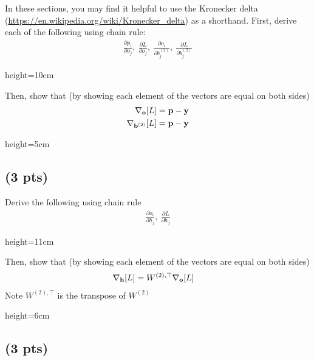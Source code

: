 In these sections, you may find it helpful to use the Kronecker delta (\url{https://en.wikipedia.org/wiki/Kronecker_delta}) as a shorthand. First, derive each of the following using chain rule:
\begin{align}
    \frac{\partial p_i}{\partial o_j},\ 
    \frac{\partial L}{\partial o_j},\ 
    \frac{\partial o_i}{\partial b_j^{(2)}},\ 
    \frac{\partial L}{\partial b_j^{(2)}}
\end{align}

\begin{soln}{height=10cm}
\ThreeAA
\end{soln}

Then, show that (by showing each element of the vectors are equal on both sides)
\begin{align}
    \nabla_{\bf{o}}[L]={\bf{p}} - {\bf{y}}\\
    \nabla_{{\bf{b}}^{(2)}}[L]={\bf{p}} - {\bf{y}}
\end{align}

\begin{soln}{height=5cm}
\ThreeAB
\end{soln}

\clearpage

\subsection{(3 pts)}

Derive the following using chain rule
\begin{align}
    \frac{\partial o_i}{\partial h_j},\ 
    \frac{\partial L}{\partial h_j}
\end{align}

\begin{soln}{height=11cm}
\ThreeBA
\end{soln}

Then, show that (by showing each element of the vectors are equal on both sides)
\begin{align}
    \nabla_{{\bf{h}}} [L] &= W^{(2),\top}\nabla_{{\bf{o}}}[L]
\end{align}
Note $W^{(2),\top}$ is the transpose of $W^{(2)}$\par

\begin{soln}{height=6cm}
\ThreeBB
\end{soln}

\clearpage

\subsection{(3 pts)}

